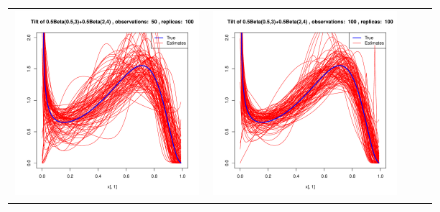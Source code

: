 \begin{figure}[h]
\begin{tabular}{cccc}
	
	\includegraphics[width=\textwidth/4]{../img/p05_a05_b3_p05_a2_b4/tilted/K3/densities/n50_R100.pdf}
	&
	\includegraphics[width=\textwidth/4]{../img/p05_a05_b3_p05_a2_b4/tilted/K3/densities/n100_R100.pdf}

\end{tabular}
\end{figure}
